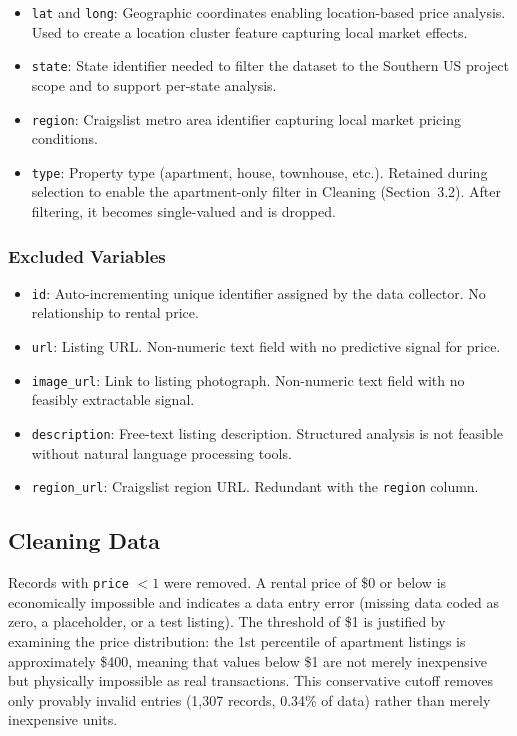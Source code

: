 \begin{itemize}
    \item \texttt{lat} and \texttt{long}: Geographic coordinates enabling location-based price analysis. Used to create a location cluster feature capturing local market effects.

    \item \texttt{state}: State identifier needed to filter the dataset to the Southern US project scope and to support per-state analysis.

    \item \texttt{region}: Craigslist metro area identifier capturing local market pricing conditions.

    \item \texttt{type}: Property type (apartment, house, townhouse, etc.). Retained during selection to enable the apartment-only filter in Cleaning (Section~3.2). After filtering, it becomes single-valued and is dropped.
\end{itemize}

\subsubsection{Excluded Variables}

\begin{itemize}
    \item \texttt{id}: Auto-incrementing unique identifier assigned by the data collector. No relationship to rental price.

    \item \texttt{url}: Listing URL. Non-numeric text field with no predictive signal for price.

    \item \texttt{image\_url}: Link to listing photograph. Non-numeric text field with no feasibly extractable signal.

    \item \texttt{description}: Free-text listing description. Structured analysis is not feasible without natural language processing tools.

    \item \texttt{region\_url}: Craigslist region URL. Redundant with the \texttt{region} column.
\end{itemize}


\subsection{Cleaning Data}
\label{subsec:Cleaning Data}
\noindent
Records with \texttt{price} $< 1$ were removed. A rental price of \$0 or below is economically impossible and indicates a data entry error (missing data coded as zero, a placeholder, or a test listing). The threshold of \$1 is justified by examining the price distribution: the 1st percentile of apartment listings is approximately \$400, meaning that values below \$1 are not merely inexpensive but physically impossible as real transactions. This conservative cutoff removes only provably invalid entries (1,307 records, 0.34\% of data) rather than merely inexpensive units.

